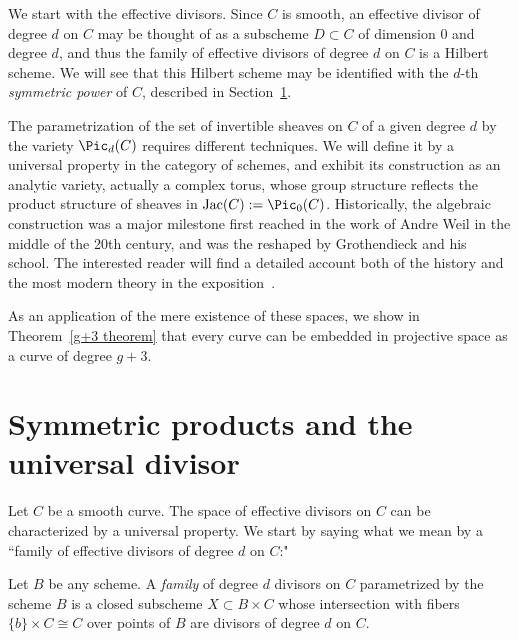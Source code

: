 
We start with the effective divisors. Since $C$ is smooth, an effective divisor of degree $d$ on $C$ may be thought of as a subscheme $D \subset C$ of dimension 0 and degree $d$, and thus
the family of effective divisors of degree $d$ on $C$ is a Hilbert scheme. We will see that this Hilbert scheme may be identified with
the $d$-th \emph{symmetric power}  of $C$, described in Section~\ref{symmetric section}. 

The parametrization of the set of invertible sheaves on $C$ of a given degree $d$ by the variety $\Pic_d(C)$ requires different techniques. We will define it by a universal property in the category of schemes, and exhibit its construction as an analytic variety, actually a complex torus, whose group structure reflects the product structure of
sheaves in $\Jac(C) := \Pic_0(C)$.
Historically, the algebraic construction was a major milestone first reached in the work of Andre Weil in the middle of
the 20th century, and was the reshaped by Grothendieck and his school. The interested reader will find a detailed account both of the history and the most
modern theory in the exposition~\cite{Kleiman}.

As an application of the mere existence of these spaces, we show in Theorem~\ref{g+3 theorem} that every curve can be embedded in projective space as a curve of degree $g+3$.

\section{Symmetric products and the universal divisor}\label{symmetric section}

Let $C$ be a smooth curve. The space of effective divisors on $C$ can be characterized by a universal property. We start by saying what we mean by a ``family of effective divisors of degree $d$ on $C$:"

\begin{definition}
Let $B$ be any scheme. A \emph{family} of degree $d$ divisors on $C$ parametrized by the scheme $B$ is a closed subscheme $X\subset B\times C$ whose intersection with fibers $\{b\} \times C \cong C$ over points of $B$ are divisors of degree $d$ on $C$.
\end{definition}

